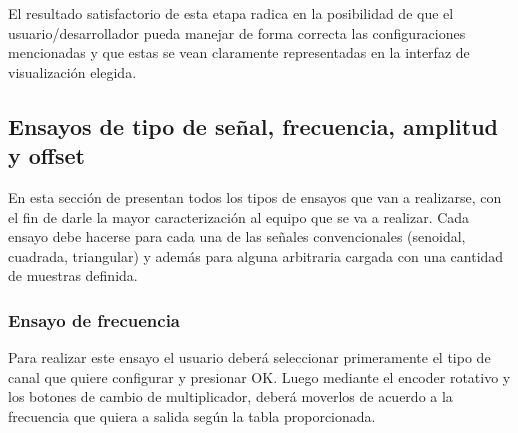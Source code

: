 El resultado satisfactorio de esta etapa radica en la posibilidad de que el usuario/desarrollador pueda manejar de forma correcta las configuraciones mencionadas y que estas se vean claramente representadas en la interfaz de visualización elegida.

%
%

\subsection{Ensayos de tipo de señal, frecuencia, amplitud y offset}
En esta sección de presentan todos los tipos de ensayos que van a realizarse, con el fin de darle la mayor caracterización al equipo que se va a realizar. Cada ensayo debe hacerse para cada una de las señales convencionales (senoidal, cuadrada, triangular) y además para alguna arbitraria cargada con una cantidad de muestras definida.

\subsubsection{Ensayo de frecuencia}
Para realizar este ensayo el usuario deberá seleccionar primeramente el tipo de canal que quiere configurar y presionar OK. Luego mediante el encoder rotativo y los botones de cambio de multiplicador, deberá moverlos de acuerdo a la frecuencia que quiera a salida según la tabla proporcionada.


